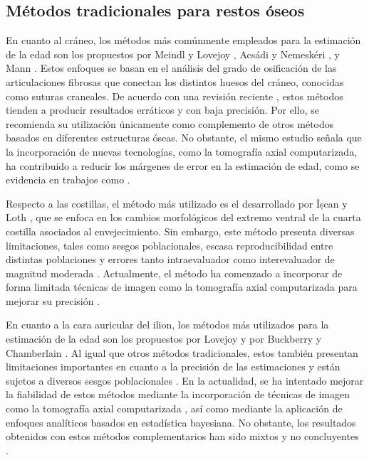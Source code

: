 \subsection{Métodos tradicionales para restos óseos}

En cuanto al cráneo, los métodos más comúnmente empleados para la estimación de la edad son los propuestos por Meindl y Lovejoy \cite{meindl1985ectocranial}, Acsádi y Nemeskéri \cite{acsadi1970history}, y Mann \cite{mann1991maxillary}. Estos enfoques se basan en el análisis del grado de osificación de las articulaciones fibrosas que conectan los distintos huesos del cráneo, conocidas como suturas craneales. De acuerdo con una revisión reciente \cite{ruengdit2020cranial}, estos métodos tienden a producir resultados erráticos y con baja precisión. Por ello, se recomienda su utilización únicamente como complemento de otros métodos basados en diferentes estructuras óseas. No obstante, el mismo estudio señala que la incorporación de nuevas tecnologías, como la tomografía axial computarizada, ha contribuido a reducir los márgenes de error en la estimación de edad, como se evidencia en trabajos como \cite{chiba2013age, boyd2015use}.

Respecto a las costillas, el método más utilizado es el desarrollado por İșcan y Loth \cite{icscan1984age, icscan1985age}, que se enfoca en los cambios morfológicos del extremo ventral de la cuarta costilla asociados al envejecimiento. Sin embargo, este método presenta diversas limitaciones, tales como sesgos poblacionales, escasa reproducibilidad entre distintas poblaciones y errores tanto intraevaluador como interevaluador de magnitud moderada \cite{fanton2010critical, hartnett2010analysis}. Actualmente, el método ha comenzado a incorporar de forma limitada técnicas de imagen como la tomografía axial computarizada para mejorar su precisión \cite{blaszkowska2019validation}.

En cuanto a la cara auricular del ilion, los métodos más utilizados para la estimación de la edad son los propuestos por Lovejoy \cite{lovejoy1985chronological} y por Buckberry y Chamberlain \cite{buckberry_age_2002}. Al igual que otros métodos tradicionales, estos también presentan limitaciones importantes en cuanto a la precisión de las estimaciones y están sujetos a diversos sesgos poblacionales \cite{falys2006auricular, michopoulou2017auricular}. En la actualidad, se ha intentado mejorar la fiabilidad de estos métodos mediante la incorporación de técnicas de imagen como la tomografía axial computarizada \cite{villa2013reliability, barrier2009age}, así como mediante la aplicación de enfoques analíticos basados en estadística bayesiana. No obstante, los resultados obtenidos con estos métodos complementarios han sido mixtos y no concluyentes \cite{nikita2018evaluation}.

